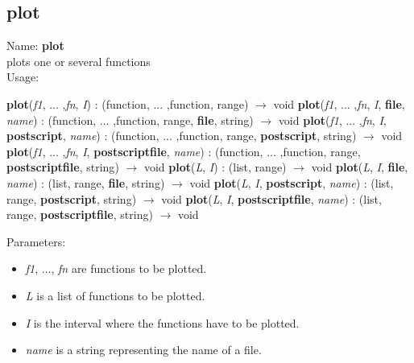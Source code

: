 \subsection{plot}
\label{labplot}
\noindent Name: \textbf{plot}\\
plots one or several functions\\
\noindent Usage: 
\begin{center}
\textbf{plot}(\emph{f1}, ... ,\emph{fn}, \emph{I}) : (\textsf{function}, ... ,\textsf{function}, \textsf{range}) $\rightarrow$ \textsf{void}
\textbf{plot}(\emph{f1}, ... ,\emph{fn}, \emph{I}, \textbf{file}, \emph{name}) : (\textsf{function}, ... ,\textsf{function}, \textsf{range}, \textbf{file}, \textsf{string}) $\rightarrow$ \textsf{void}
\textbf{plot}(\emph{f1}, ... ,\emph{fn}, \emph{I}, \textbf{postscript}, \emph{name}) : (\textsf{function}, ... ,\textsf{function}, \textsf{range}, \textbf{postscript}, \textsf{string}) $\rightarrow$ \textsf{void}
\textbf{plot}(\emph{f1}, ... ,\emph{fn}, \emph{I}, \textbf{postscriptfile}, \emph{name}) : (\textsf{function}, ... ,\textsf{function}, \textsf{range}, \textbf{postscriptfile}, \textsf{string}) $\rightarrow$ \textsf{void}
\textbf{plot}(\emph{L}, \emph{I}) : (\textsf{list}, \textsf{range}) $\rightarrow$ \textsf{void}
\textbf{plot}(\emph{L}, \emph{I}, \textbf{file}, \emph{name}) : (\textsf{list}, \textsf{range}, \textbf{file}, \textsf{string}) $\rightarrow$ \textsf{void}
\textbf{plot}(\emph{L}, \emph{I}, \textbf{postscript}, \emph{name}) : (\textsf{list}, \textsf{range}, \textbf{postscript}, \textsf{string}) $\rightarrow$ \textsf{void}
\textbf{plot}(\emph{L}, \emph{I}, \textbf{postscriptfile}, \emph{name}) : (\textsf{list}, \textsf{range}, \textbf{postscriptfile}, \textsf{string}) $\rightarrow$ \textsf{void}
\end{center}
Parameters: 
\begin{itemize}
\item \emph{f1}, ..., \emph{fn} are functions to be plotted.
\item \emph{L} is a list of functions to be plotted.
\item \emph{I} is the interval where the functions have to be plotted.
\item \emph{name} is a string representing the name of a file.
\end{itemize}
